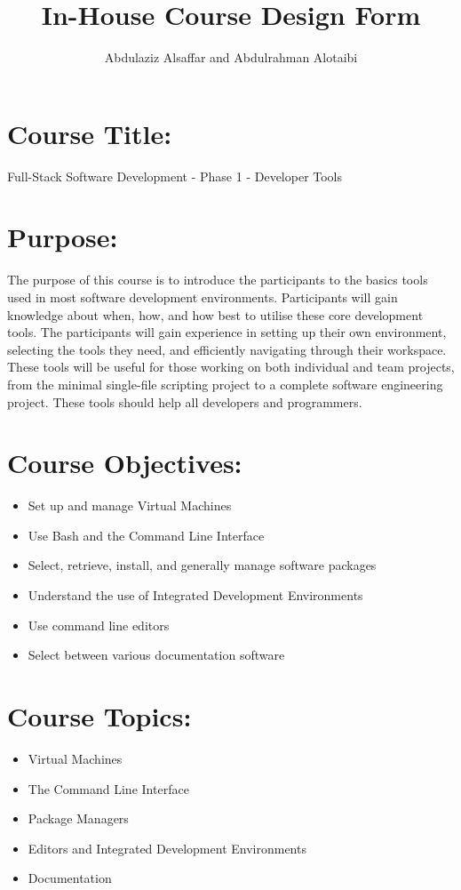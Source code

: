 \documentclass[a4paper,11pt]{article}
\author{Abdulaziz Alsa{f}far and Abdulrahman Alotaibi}
\title{In-House Course Design Form}
\begin{document}
\maketitle
\pagestyle{plain}
\setcounter{page}{1}

\section{Course Title:}
Full-Stack Software Development - Phase 1 - Developer Tools

\section{Purpose:}
The purpose of this course is to introduce the participants to the basics tools used in most software development environments.
Participants will gain knowledge about when, how, and how best to utilise these core development tools. 
The participants will gain experience in setting up their own environment, selecting the tools they need, and e{f}ficiently navigating through their workspace. These tools will be useful for those working on both individual and team projects, from the minimal single-{f}ile scripting project to a complete software engineering project. These tools should help all developers and programmers.

\section{Course Objectives:}
\begin{itemize}
	\item Set up and manage Virtual Machines
	\item Use Bash and the Command Line Interface
	\item Select, retrieve, install, and generally manage software packages
	\item Understand the use of Integrated Development Environments
	\item Use command line editors
	\item Select between various documentation software
\end{itemize}

\section{Course Topics:}
\begin{itemize}
	\item Virtual Machines
	\item The Command Line Interface
	\item Package Managers
	\item Editors and Integrated Development Environments
	\item Documentation
\end{itemize}
\end{document}
